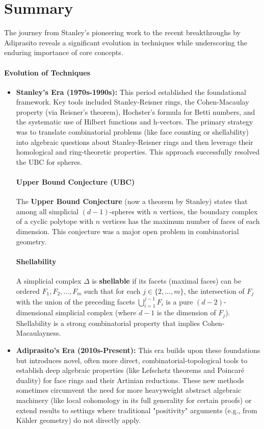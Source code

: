 \documentclass[12pt]{article}
\theoremstyle{definition}
\numberwithin{equation}{subsection}
\begin{document}
\section*{Summary}
The journey from Stanley's pioneering work to the recent breakthroughs by Adiprasito reveals a significant evolution in techniques while underscoring the enduring importance of core concepts.

\paragraph{Evolution of Techniques}
\begin{itemize}
\item \textbf{Stanley's Era (1970s-1990s):} This period established the foundational framework. Key tools included Stanley-Reisner rings, the Cohen-Macaulay property (via Reisner's theorem), Hochster's formula for Betti numbers, and the systematic use of Hilbert functions and h-vectors. The primary strategy was to translate combinatorial problems (like face counting or shellability) into algebraic questions about Stanley-Reisner rings and then leverage their homological and ring-theoretic properties. This approach successfully resolved the UBC for spheres.

\paragraph{Upper Bound Conjecture (UBC)}
The \textbf{Upper Bound Conjecture} (now a theorem by Stanley) states that among all simplicial $(d-1)$-spheres with $n$ vertices, the boundary complex of a cyclic polytope with $n$ vertices has the maximum number of faces of each dimension. This conjecture was a major open problem in combinatorial geometry.

\paragraph{Shellability}
A simplicial complex $\Delta$ is \textbf{shellable} if its facets (maximal faces) can be ordered $F_1, F_2, \ldots, F_m$ such that for each $j \in \{2, \ldots, m\}$, the intersection of $F_j$ with the union of the preceding facets $\bigcup_{i=1}^{j-1} F_i$ is a pure $(d-2)$-dimensional simplicial complex (where $d-1$ is the dimension of $F_j$). Shellability is a strong combinatorial property that implies Cohen-Macaulayness.

\item \textbf{Adiprasito's Era (2010s-Present):} This era builds upon these foundations but introduces novel, often more direct, combinatorial-topological tools to establish deep algebraic properties (like Lefschetz theorems and Poincaré duality) for face rings and their Artinian reductions. These new methods sometimes circumvent the need for more heavyweight abstract algebraic machinery (like local cohomology in its full generality for certain proofs) or extend results to settings where traditional "positivity" arguments (e.g., from Kähler geometry) do not directly apply.


\end{itemize}
\end{document}
